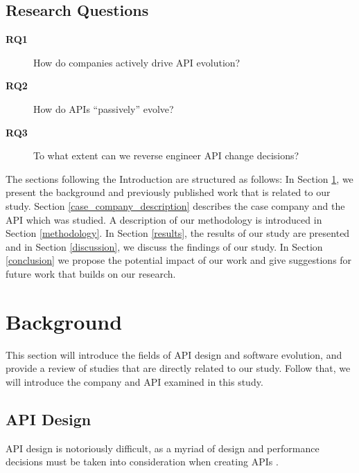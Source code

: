 \documentclass{sig-alternate}
\begin{document}


\subsection{Research Questions} \label{rqs}
\begin{description}
\item[\textbf{RQ1}] How do companies actively drive API evolution?
\item[\textbf{RQ2}] How do APIs ``passively'' evolve?
\item[\textbf{RQ3}] To what extent can we reverse engineer API change decisions?


\end{description}

The sections following the Introduction are structured as follows: In Section \ref{background}, we present the background and previously published work that is related to our study. Section \ref{case_company_description} describes the case company and the API which was studied. A description of our methodology is introduced in Section \ref{methodology}. In Section \ref{results}, the results of our study are presented and in Section \ref{discussion}, we discuss the findings of our study. In Section \ref{conclusion} we propose the potential impact of our work and give suggestions for future work that builds on our research. 

\section{Background} \label{background}
This section will introduce the fields of API design and software evolution, and provide a review of studies that are directly related to our study. Follow that, we will introduce the company and API examined in this study. 


\subsection{API Design} \label{api_design}
API design is notoriously difficult, as a myriad of design and performance decisions must be taken into consideration when creating APIs \cite{afonso2012evaluating, bloch2008effective, stylos2006comparing}.
\end{document}
